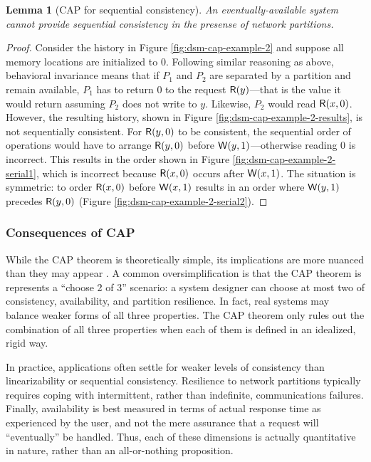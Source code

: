 \documentclass[]             %
{NASA}                       %
\newtheorem{lemma}[theorem]{Lemma}
\theoremstyle{definition}
\begin{document}
\begin{lemma}[CAP for sequential consistency]
  \label{thm:cap-sequential}
  An eventually-available system cannot provide sequential consistency
  in the presense of network partitions.
\end{lemma}
\begin{proof}
  Consider the history in Figure \ref{fig:dsm-cap-example-2} and
  suppose all memory locations are initialized to $0$. Following
  similar reasoning as above, behavioral invariance means that if
  $P_1$ and $P_2$ are separated by a partition and remain available,
  $P_1$ has to return $0$ to the request $\mathsf{R}\!\left(y\right)$---that is the
  value it would return assuming $P_2$ does not write to
  $y$. Likewise, $P_2$ would read $\mathsf{R}\!\left(x, 0\right)$. However, the
  resulting history, shown in Figure
  \ref{fig:dsm-cap-example-2-results}, is not sequentially
  consistent. For $\mathsf{R}\!\left(y, 0\right)$ to be consistent, the sequential
  order of operations would have to arrange $\mathsf{R}\!\left(y, 0\right)$ before
  $\mathsf{W}\!\left(y, 1\right)$---otherwise reading $0$ is incorrect. This results
  in the order shown in Figure \ref{fig:dsm-cap-example-2-serial1},
  which is incorrect because $\mathsf{R}\!\left(x, 0\right)$ occurs after
  $\mathsf{W}\!\left(x, 1\right)$. The situation is symmetric: to order
  $\mathsf{R}\!\left(x, 0\right)$ before $\mathsf{W}\!\left(x, 1\right)$ results in an order where
  $\mathsf{W}\!\left(y, 1\right)$ precedes $\mathsf{R}\!\left(y, 0\right)$ (Figure \ref{fig:dsm-cap-example-2-serial2}).
\end{proof}

\subsubsection{Consequences of CAP}
\label{interpretation-of-the-cap-theorem}
While the CAP theorem is theoretically simple, its implications are
more nuanced than they may appear \cite{2012CAP12Years}. A common
oversimplification is that the CAP theorem is represents a ``choose 2
of 3'' scenario: a system designer can choose at most two of
consistency, availability, and partition resilience. In fact, real
systems may balance weaker forms of all three properties. The CAP
theorem only rules out the combination of all three properties when
each of them is defined in an idealized, rigid way.

In practice, applications often settle for weaker levels of
consistency than linearizability or sequential consistency. Resilience
to network partitions typically requires coping with intermittent,
rather than indefinite, communications failures. Finally, availability
is best measured in terms of actual response time as experienced by
the user, and not the mere assurance that a request will
``eventually'' be handled. Thus, each of these dimensions is actually
quantitative in nature, rather than an all-or-nothing proposition.
\end{document}
